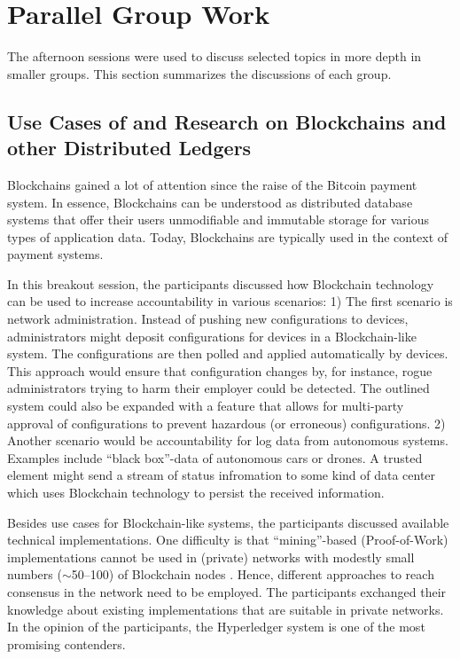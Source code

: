 \section{Parallel Group Work}\label{sec:parallel-group-work}

The afternoon sessions were used to discuss selected topics in more depth in
smaller groups. This section summarizes the discussions of each group.


\subsection{Use Cases of and Research on Blockchains and other Distributed Ledgers}

Blockchains gained a lot of attention since the raise of the Bitcoin \cite{bitcoin} payment system. In essence, Blockchains can be understood as distributed database systems that offer their users unmodifiable and immutable storage for various types of application data. Today, Blockchains are typically used in the context of payment systems.

In this breakout session, the participants discussed how Blockchain technology can be used to increase accountability in various scenarios: 1) The first scenario is network administration. Instead of pushing new configurations to devices, administrators might deposit configurations for devices in a Blockchain-like system. The configurations are then polled and applied automatically by devices. This approach would ensure that configuration changes by, for instance, rogue administrators trying to harm their employer could be detected. The outlined system could also be expanded with a feature that allows for multi-party approval of configurations to prevent hazardous (or erroneous) configurations. 2) Another scenario would be accountability for log data from autonomous systems. Examples include ``black box''-data of autonomous cars or drones. A trusted element might send a stream of status infromation to some kind of data center which uses Blockchain technology to persist the received information.

Besides use cases for Blockchain-like systems, the participants discussed available technical implementations. One difficulty is that ``mining''-based (Proof-of-Work) \cite{hashcash} implementations cannot be used in (private) networks with modestly small numbers ($\sim$50--100) of Blockchain nodes \cite{dangerPBC}. Hence, different approaches to reach consensus in the network need to be employed. The participants exchanged their knowledge about existing implementations that are suitable in private networks. In the opinion of the participants, the Hyperledger system \cite{hyperledger} is one of the most promising contenders.

